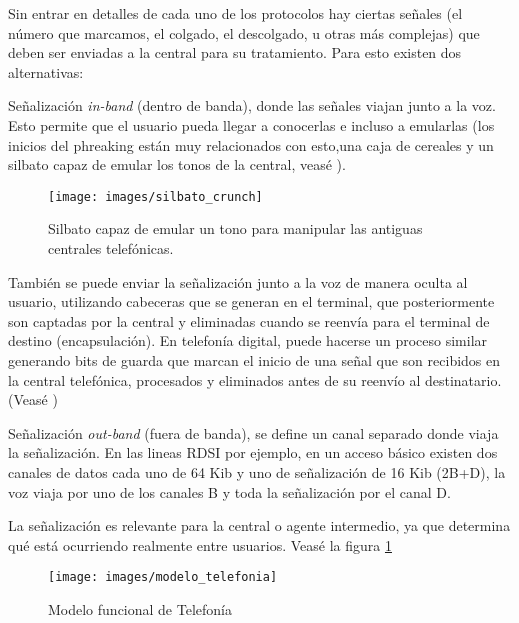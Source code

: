 Sin entrar en detalles de cada uno de los protocolos hay ciertas señales (el número que marcamos, el colgado, el descolgado, u otras más complejas) que deben ser enviadas a la central para su tratamiento. Para esto existen dos alternativas:

\begin{list}{-}{}
  \label{lst:tipos-de-sel}
\item Señalización \emph{in-band} (dentro de banda), donde las señales viajan junto a la voz. Esto permite que el usuario pueda llegar a conocerlas e incluso a emularlas (los inicios del phreaking están muy relacionados con esto,una caja de cereales y un silbato capaz de emular los tonos de la central, veasé \cite{wikipedia-crunch}).

  \begin{figure}[!b]
    \centering
    \texttt{[image: images/silbato\_crunch]}
    \caption{Silbato capaz de emular un tono para manipular las antiguas centrales telefónicas.}
  \end{figure}


 También se puede enviar la señalización junto a la voz de manera oculta al usuario, utilizando cabeceras que se generan en el terminal, que posteriormente son captadas por la central y eliminadas cuando se reenvía para el terminal de destino (encapsulación). En telefonía digital, puede hacerse un proceso similar generando bits de guarda que marcan el inicio de una señal que son recibidos en la central telefónica, procesados y eliminados antes de su reenvío al destinatario. (Veasé \cite{wikipedia-inband})

\item Señalización \emph{out-band} (fuera de banda), se define un canal separado donde viaja la señalización. En las lineas RDSI por ejemplo, en un acceso básico existen dos canales de datos cada uno de 64 Kib  y uno de señalización de 16 Kib (2B+D), la voz viaja por uno de los canales B y toda la señalización por el canal D.

 \end{list}

La señalización es relevante para la central o agente intermedio, ya que determina qué está ocurriendo realmente entre usuarios. Veasé la figura \ref{fig:modelo-funcional}

\begin{figure}
  \centering
  \texttt{[image: images/modelo\_telefonia]}
  \caption{Modelo funcional de Telefonía}
  \label{fig:modelo-funcional}
\end{figure}

